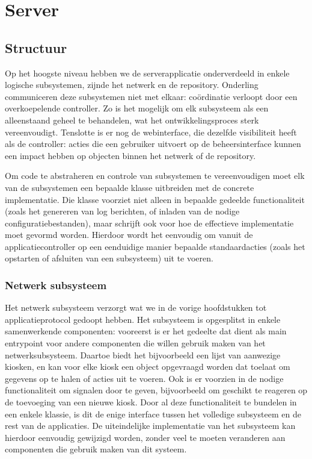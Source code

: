 \part{Server}
\label{server}

\chapter{Structuur}

Op het hoogste niveau hebben we de serverapplicatie onderverdeeld in enkele logische subsystemen, zijnde het netwerk en de repository. Onderling communiceren deze subsystemen niet met elkaar: coördinatie verloopt door een overkoepelende controller. Zo is het mogelijk om elk subsysteem als een alleenstaand geheel te behandelen, wat het ontwikkelingsproces sterk vereenvoudigt. Tenslotte is er nog de webinterface, die dezelfde visibiliteit heeft als de controller: acties die een gebruiker uitvoert op de beheersinterface kunnen een impact hebben op objecten binnen het netwerk of de repository.

Om code te abstraheren en controle van subsystemen te vereenvoudigen moet elk van de subsystemen een bepaalde klasse uitbreiden met de concrete implementatie. Die klasse voorziet niet alleen in bepaalde gedeelde functionaliteit (zoals het genereren van log berichten, of inladen van de nodige configuratiebestanden), maar schrijft ook voor hoe de effectieve implementatie moet gevormd worden. Hierdoor wordt het eenvoudig om vanuit de applicatiecontroller op een eenduidige manier bepaalde standaardacties (zoals het opstarten of afsluiten van een subsysteem) uit te voeren.

\section{Netwerk subsysteem}

Het netwerk subsysteem verzorgt wat we in de vorige hoofdstukken tot applicatieprotocol gedoopt hebben. Het subsysteem is opgesplitst in enkele samenwerkende componenten: vooreerst is er het gedeelte dat dient als main entrypoint voor andere componenten die willen gebruik maken van het netwerksubsysteem. Daartoe biedt het bijvoorbeeld een lijst van aanwezige kiosken, en kan voor elke kiosk een object opgevraagd worden dat toelaat om gegevens op te halen of acties uit te voeren. Ook is er voorzien in de nodige functionaliteit om signalen door te geven, bijvoorbeeld om geschikt te reageren op de toevoeging van een nieuwe kiosk.
Door al deze functionaliteit te bundelen in een enkele klassie, is dit de enige interface tussen het volledige subsysteem en de rest van de applicaties. De uiteindelijke implementatie van het subsysteem kan hierdoor eenvoudig gewijzigd worden, zonder veel te moeten veranderen aan componenten die gebruik maken van dit systeem.

